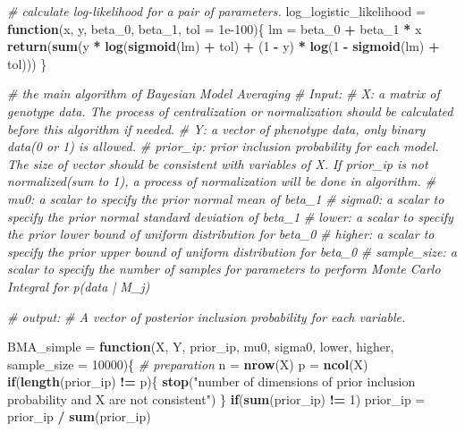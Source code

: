 \documentclass[
]{article}
\newenvironment{Shaded}{\begin{snugshade}}{\end{snugshade}}
\newcommand{\CommentTok}[1]{\textcolor[rgb]{0.56,0.35,0.01}{\textit{#1}}}
\newcommand{\ControlFlowTok}[1]{\textcolor[rgb]{0.13,0.29,0.53}{\textbf{#1}}}
\newcommand{\DataTypeTok}[1]{\textcolor[rgb]{0.13,0.29,0.53}{#1}}
\newcommand{\DecValTok}[1]{\textcolor[rgb]{0.00,0.00,0.81}{#1}}
\newcommand{\FloatTok}[1]{\textcolor[rgb]{0.00,0.00,0.81}{#1}}
\newcommand{\KeywordTok}[1]{\textcolor[rgb]{0.13,0.29,0.53}{\textbf{#1}}}
\newcommand{\NormalTok}[1]{#1}
\newcommand{\OperatorTok}[1]{\textcolor[rgb]{0.81,0.36,0.00}{\textbf{#1}}}
\newcommand{\StringTok}[1]{\textcolor[rgb]{0.31,0.60,0.02}{#1}}
\begin{document}
\begin{Shaded}
\begin{Highlighting}[]
\CommentTok{# calculate log-likelihood for a pair of parameters.}
\NormalTok{log_logistic_likelihood =}\StringTok{ }\ControlFlowTok{function}\NormalTok{(x, y, beta_}\DecValTok{0}\NormalTok{, beta_}\DecValTok{1}\NormalTok{, }\DataTypeTok{tol =} \FloatTok{1e-100}\NormalTok{)\{}
\NormalTok{  lm =}\StringTok{ }\NormalTok{beta_}\DecValTok{0} \OperatorTok{+}\StringTok{ }\NormalTok{beta_}\DecValTok{1} \OperatorTok{*}\StringTok{ }\NormalTok{x}
  \KeywordTok{return}\NormalTok{(}\KeywordTok{sum}\NormalTok{(y }\OperatorTok{*}\StringTok{ }\KeywordTok{log}\NormalTok{(}\KeywordTok{sigmoid}\NormalTok{(lm) }\OperatorTok{+}\StringTok{ }\NormalTok{tol) }\OperatorTok{+}\StringTok{ }\NormalTok{(}\DecValTok{1} \OperatorTok{-}\StringTok{ }\NormalTok{y) }\OperatorTok{*}\StringTok{ }\KeywordTok{log}\NormalTok{(}\DecValTok{1} \OperatorTok{-}\StringTok{ }\KeywordTok{sigmoid}\NormalTok{(lm) }\OperatorTok{+}\StringTok{ }\NormalTok{tol)))}
\NormalTok{\}}

\CommentTok{# the main algorithm of Bayesian Model Averaging}
\CommentTok{# Input:}
\CommentTok{# X: a matrix of genotype data. The process of centralization or normalization should be calculated before this algorithm if needed.}
\CommentTok{# Y: a vector of phenotype data, only binary data(0 or 1) is allowed. }
\CommentTok{# prior_ip: prior inclusion probability for each model. The size of vector should be consistent with variables of X. If prior_ip is not normalized(sum to 1), a process of normalization will be done in algorithm.}
\CommentTok{# mu0: a scalar to specify the prior normal mean of beta_1}
\CommentTok{# sigma0: a scalar to specify the prior normal standard deviation of beta_1}
\CommentTok{# lower: a scalar to specify the prior lower bound of uniform distribution for beta_0}
\CommentTok{# higher: a scalar to specify the prior upper bound of uniform distribution for beta_0}
\CommentTok{# sample_size: a scalar to specify the number of samples for parameters to perform Monte Carlo Integral for p(data | M_j)}

\CommentTok{# output:}
\CommentTok{# A vector of posterior inclusion probability for each variable.}

\NormalTok{BMA_simple =}\StringTok{ }\ControlFlowTok{function}\NormalTok{(X, Y, prior_ip, mu0, sigma0, lower, higher, }\DataTypeTok{sample_size =} \DecValTok{10000}\NormalTok{)\{}
  \CommentTok{# preparation}
\NormalTok{  n =}\StringTok{ }\KeywordTok{nrow}\NormalTok{(X)}
\NormalTok{  p =}\StringTok{ }\KeywordTok{ncol}\NormalTok{(X)}
  \ControlFlowTok{if}\NormalTok{(}\KeywordTok{length}\NormalTok{(prior_ip) }\OperatorTok{!=}\StringTok{ }\NormalTok{p)\{}
    \KeywordTok{stop}\NormalTok{(}\StringTok{"number of dimensions of prior inclusion probability and X are not consistent"}\NormalTok{)}
\NormalTok{  \}}
  \ControlFlowTok{if}\NormalTok{(}\KeywordTok{sum}\NormalTok{(prior_ip) }\OperatorTok{!=}\StringTok{ }\DecValTok{1}\NormalTok{)}
\NormalTok{    prior_ip =}\StringTok{ }\NormalTok{prior_ip }\OperatorTok{/}\StringTok{ }\KeywordTok{sum}\NormalTok{(prior_ip)}
  

\end{Highlighting}
\end{Shaded}
\end{document}
